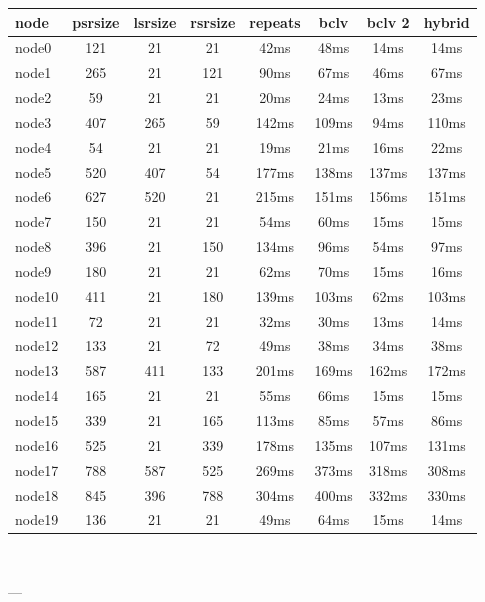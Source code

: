 

\begin{tabular}{|l|c|c|c|c|c|c|c|}
\hline node & psrsize & lsrsize & rsrsize   & repeats & bclv & bclv 2 & hybrid\\
    \hline node0 & 121 & 21 & 21 & 42ms & 48ms & 14ms & 14ms\\
    \hline node1 & 265 & 21 & 121 & 90ms & 67ms & 46ms & 67ms\\
    \hline node2 & 59 & 21 & 21 & 20ms & 24ms & 13ms & 23ms\\
    \hline node3 & 407 & 265 & 59 & 142ms & 109ms & 94ms & 110ms\\
    \hline node4 & 54 & 21 & 21 & 19ms & 21ms & 16ms & 22ms\\
    \hline node5 & 520 & 407 & 54 & 177ms & 138ms & 137ms & 137ms\\
    \hline node6 & 627 & 520 & 21 & 215ms & 151ms & 156ms & 151ms\\
    \hline node7 & 150 & 21 & 21 & 54ms & 60ms & 15ms & 15ms\\
    \hline node8 & 396 & 21 & 150 & 134ms & 96ms & 54ms & 97ms\\
    \hline node9 & 180 & 21 & 21 & 62ms & 70ms & 15ms & 16ms\\
    \hline node10 & 411 & 21 & 180 & 139ms & 103ms & 62ms & 103ms\\
    \hline node11 & 72 & 21 & 21 & 32ms & 30ms & 13ms & 14ms\\
    \hline node12 & 133 & 21 & 72 & 49ms & 38ms & 34ms & 38ms\\
    \hline node13 & 587 & 411 & 133 & 201ms & 169ms & 162ms & 172ms\\
    \hline node14 & 165 & 21 & 21 & 55ms & 66ms & 15ms & 15ms\\
    \hline node15 & 339 & 21 & 165 & 113ms & 85ms & 57ms & 86ms\\
    \hline node16 & 525 & 21 & 339 & 178ms & 135ms & 107ms & 131ms\\
    \hline node17 & 788 & 587 & 525 & 269ms & 373ms & 318ms & 308ms\\
    \hline node18 & 845 & 396 & 788 & 304ms & 400ms & 332ms & 330ms\\
    \hline node19 & 136 & 21 & 21 & 49ms & 64ms & 15ms & 14ms\\

\hline
\end{tabular} \

---


